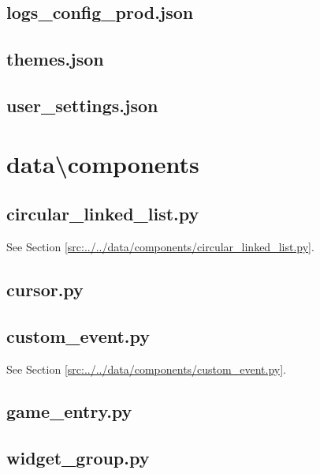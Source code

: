 \documentclass[../main/main.tex]{subfiles}
\begin{document}
\subsection{logs\_config\_prod.json}

\label{src:data/app_data/logs_config_prod.json}

\subsection{themes.json}

\label{src:data/app_data/themes.json}

\subsection{user\_settings.json}

\label{src:data/app_data/user_settings.json}

\section{data\textbackslash components}
\subsection{circular\_linked\_list.py}
See Section \ref{src:../../data/components/circular_linked_list.py}.

\subsection{cursor.py}

\label{src:data/components/cursor.py}

\subsection{custom\_event.py}
See Section \ref{src:../../data/components/custom_event.py}.

\subsection{game\_entry.py}

\label{src:data/components/game_entry.py}

\subsection{widget\_group.py}

\label{src:data/components/widget_group.py}
\end{document}
